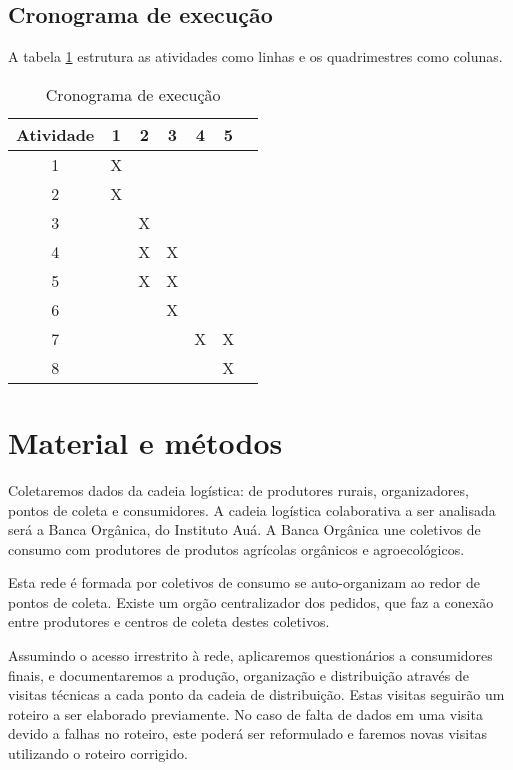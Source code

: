 \documentclass[
	12pt,				%
	openright,			%
	oneside,			%
	a4paper,			%
	english,			%
	french,				%
	spanish,			%
	brazil,				%
	]{abntex2}
\begin{document}
\section{Cronograma de execução}

A tabela \ref{tabela:1} estrutura as atividades como linhas e os quadrimestres como colunas.

\begin{table}[h!]
\begin{center}
 \begin{tabular}{|| c || c | c | c | c | c | c ||} 
 \hline
 Atividade  & 1 & 2 & 3 & 4 & 5 \\ [0.5ex] 
 \hline\hline
 1 & X & & & &  \\ 
 \hline
 2 & X & & & &  \\
 \hline
 3 & & X &  & & \\
 \hline
 4 & & X & X & & \\
 \hline
 5 & & X & X & & \\ 
 \hline
 6 & & & X & & \\ 
 \hline
 7 & & & & X & X \\
 \hline
 8 & & & & & X \\ [1ex] 
 \hline
\end{tabular}
\end{center}
\caption{Cronograma de execução}
\label{tabela:1}
\end{table}

\chapter{Material e métodos}

Coletaremos dados da cadeia logística: de produtores rurais, organizadores, pontos de coleta e consumidores. A cadeia logística colaborativa a ser analisada será a Banca Orgânica, do Instituto Auá. A Banca Orgânica une coletivos de consumo com produtores de produtos agrícolas orgânicos e agroecológicos.

Esta rede é formada por coletivos de consumo se auto-organizam ao redor de pontos de coleta. Existe um orgão centralizador dos pedidos, que faz a conexão entre produtores e centros de coleta destes coletivos.

Assumindo o acesso irrestrito à rede, aplicaremos questionários a consumidores finais, e documentaremos a produção, organização e distribuição através de visitas técnicas a cada ponto da cadeia de distribuição. Estas visitas seguirão um roteiro a ser elaborado previamente. No caso de falta de dados em uma visita devido a falhas no roteiro, este poderá ser reformulado e faremos novas visitas utilizando o roteiro corrigido.
\end{document}
